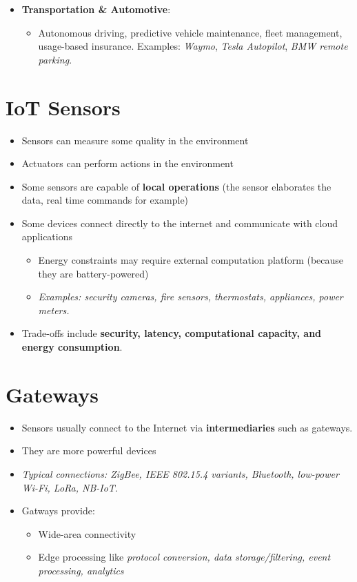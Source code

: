 \begin{itemize}
    \item \textbf{Transportation \& Automotive}:
    
    \begin{itemize}
        \item Autonomous driving, predictive vehicle maintenance, fleet management, usage-based insurance. Examples: \textit{Waymo}, \textit{Tesla Autopilot}, \textit{BMW remote parking}.
    \end{itemize}
\end{itemize}

\section{IoT Sensors}
\begin{itemize}
    \item Sensors can measure some quality in the environment
    \item Actuators can perform actions in the environment
    \item Some sensors are capable of \textbf{local operations} (the sensor elaborates the data, real time commands for example)
    \item Some devices connect directly to the internet and communicate with cloud applications
    \begin{itemize}
        \item Energy constraints may require external computation platform (because they are battery-powered)
        \item \textit{Examples: security cameras, fire sensors, thermostats, appliances, power meters.}
    \end{itemize}
    \item Trade-offs include \textbf{security, latency, computational capacity, and energy consumption}.
\end{itemize}

\section{Gateways}
\begin{itemize}
    \item Sensors usually connect to the Internet via \textbf{intermediaries} such as gateways.
    \item They are more powerful devices
    \item \textit{Typical connections: ZigBee, IEEE 802.15.4 variants, Bluetooth, low-power Wi-Fi, LoRa, NB-IoT.}
    \item Gatways provide:
    \begin{itemize}
        \item Wide-area connectivity
        \item Edge processing like \textit{protocol conversion, data storage/filtering, event processing, analytics}
    \end{itemize}
\end{itemize}

